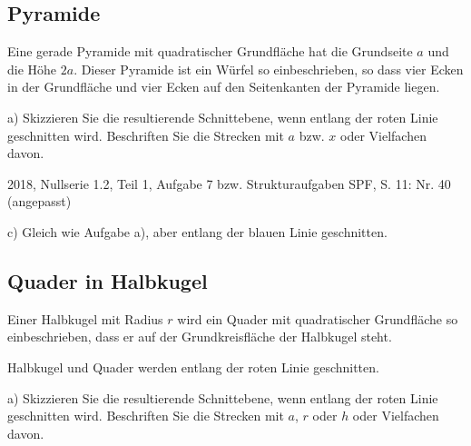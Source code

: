 \subsection{Pyramide}
Eine gerade Pyramide mit quadratischer Grundfläche hat die
Grundseite $a$ und die Höhe $2a$. Dieser Pyramide ist ein Würfel
so einbeschrieben, so dass vier Ecken in der Grundfläche und
vier Ecken auf den Seitenkanten der Pyramide liegen.

a) Skizzieren Sie die resultierende Schnittebene, wenn entlang der
roten Linie geschnitten wird. Beschriften Sie die Strecken mit $a$ bzw.
$x$ oder Vielfachen davon.

{\tiny{2018, Nullserie 1.2, Teil 1, Aufgabe 7 bzw. Strukturaufgaben SPF, S. 11: Nr. 40 (angepasst)}}


c) Gleich wie Aufgabe a), aber entlang der blauen Linie geschnitten.



\subsection{Quader in Halbkugel}

Einer Halbkugel mit Radius $r$ wird ein Quader mit quadratischer
Grundfläche so einbeschrieben, dass er auf der Grundkreisfläche
der Halbkugel steht.

Halbkugel und Quader werden entlang der roten Linie geschnitten.


a) Skizzieren Sie die resultierende Schnittebene, wenn entlang der
roten Linie geschnitten wird. Beschriften Sie die Strecken mit $a$,
$r$ oder $h$ oder Vielfachen davon.


